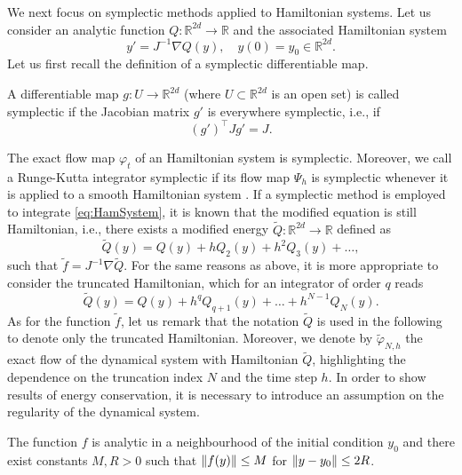 \documentclass{siamart1116}
\numberwithin{theorem}{section}
\DeclarePairedDelimiter{\norm}{\|}{\|}
\renewcommand{\phi}{\varphi}
\newcommand{\R}{\mathbb{R}}
\begin{document}
We next focus on symplectic methods applied to Hamiltonian systems. Let us consider an analytic function $Q \colon \R^{2d} \to \R$ and the associated Hamiltonian system
\begin{equation}\label{eq:HamSystem}
y' = J^{-1}\nabla Q(y), \quad y(0) = y_0 \in \R^{2d}.
\end{equation}
Let us first recall the definition of a symplectic differentiable map.
\begin{definition} A differentiable map $g\colon U \to \R^{2d}$ (where $U\subset \R^{2d}$ is an open set) is called symplectic if the Jacobian matrix $g'$ is everywhere symplectic, i.e., if
\begin{equation}
	(g')^\top J g' = J.
\end{equation}	
\end{definition}
The exact flow map $\phi_t$ of an Hamiltonian system is symplectic. Moreover, we call a Runge-Kutta integrator symplectic if its flow map $\Psi_h$ is symplectic whenever it is applied to a smooth Hamiltonian system \cite{HLW06}. If a symplectic method is employed to integrate \eqref{eq:HamSystem}, it is known that the modified equation is still Hamiltonian, i.e., there exists a modified energy $\tilde Q \colon \R^{2d} \to \R$ defined as
\begin{equation}\label{eq:ModifiedHamiltonian}
\tilde Q(y) = Q(y) + h Q_2(y) + h^2 Q_3(y) + \ldots,
\end{equation}
such that $\tilde f = J^{-1}\nabla \tilde Q$. For the same reasons as above, it is more appropriate to consider the truncated Hamiltonian, which for an integrator of order $q$ reads
\begin{equation}\label{eq:ModifiedHamiltonianTrunc}
	\tilde Q(y) = Q(y) + h^q Q_{q+1}(y) + \ldots + h^{N-1} Q_N(y).
\end{equation}
As for the function $\tilde f$, let us remark that the notation $\tilde Q$ is used in the following to denote only the truncated Hamiltonian. Moreover, we denote by $\tilde \phi_{N, h}$ the exact flow of the dynamical system with Hamiltonian $\tilde Q$, highlighting the dependence on the truncation index $N$ and the time step $h$. In order to show results of energy conservation, it is necessary to introduce an assumption on the regularity of the dynamical system.

\begin{assumption}\label{as:RegHamiltonian} The function $f$ is analytic in a neighbourhood of the initial condition $y_0$ and there exist constants $M, R > 0$ such that $\norm{f(y)} \leq M$ for $\norm{y - y_0} \leq 2R$.
\end{assumption}
\end{document}
